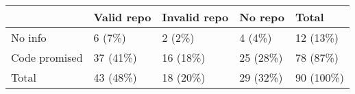\begin{tabular}{lllll}
\hline
 & Valid repo & Invalid repo & No repo &Total\\
\hline
 No info & 6 (7\%)& 2 (2\%)& 4 (4\%)& 12 (13\%)\\
 Code promised & 37 (41\%)& 16 (18\%)& 25 (28\%)& 78 (87\%)\\
 Total & 43 (48\%)& 18 (20\%)& 29 (32\%)& 90 (100\%)\\
\hline
\end{tabular}
